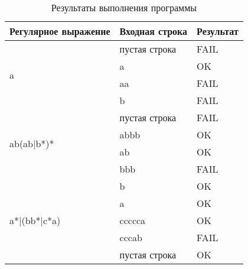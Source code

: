 \begin{table}[h!]
\caption{Результаты выполнения программы}
\label{tab:results}
\begin{tabular}{|l|l|l|}
\hline
\textbf{Регулярное выражение} & \textbf{Входная строка} & \textbf{Результат} \\ \hline
\multirow{4}{*}{a}            & пустая строка           & FAIL               \\ \cline{2-3} 
                              & a                       & OK                 \\ \cline{2-3} 
                              & aa                      & FAIL               \\ \cline{2-3} 
                              & b                       & FAIL               \\ \hline
\multirow{4}{*}{ab(ab|b*)*}   & пустая строка           & FAIL               \\ \cline{2-3} 
                              & abbb                    & OK                 \\ \cline{2-3} 
                              & ab                      & OK                 \\ \cline{2-3} 
                              & bbb                     & FAIL               \\ \hline
\multirow{5}{*}{a*|(bb*|c*a)} & b                       & OK                 \\ \cline{2-3} 
                              & a                       & OK                 \\ \cline{2-3} 
                              & ccccca                  & OK                 \\ \cline{2-3} 
                              & cccab                   & FAIL               \\ \cline{2-3} 
                              & пустая строка           & OK                 \\ \hline
\end{tabular}
\end{table}
